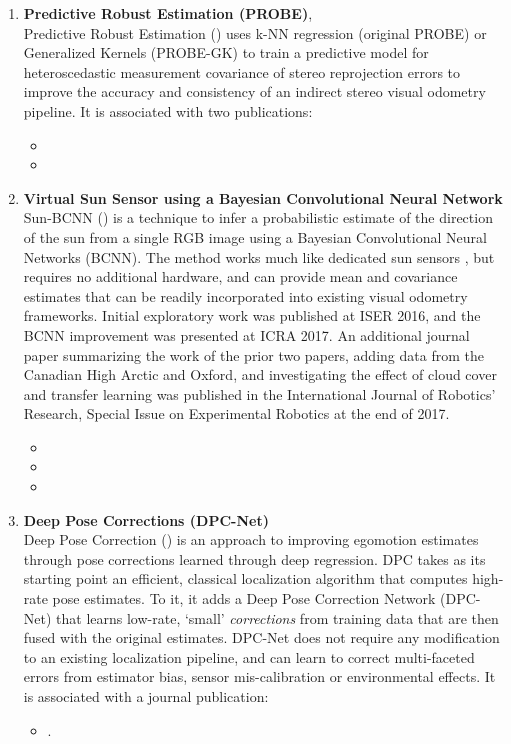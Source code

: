 \begin{enumerate}
\item \textbf{Predictive Robust Estimation (PROBE)},  \\
Predictive Robust Estimation () uses k-NN regression (original PROBE) or Generalized Kernels \citep{Vega-Brown2014-sb} (PROBE-GK) to train a predictive model for heteroscedastic measurement covariance of stereo reprojection errors to improve the accuracy and consistency of an indirect stereo visual odometry pipeline. It is associated with two publications:
\begin{itemize}
\item {}
\item {}
\end{itemize}

\item \textbf{Virtual Sun Sensor using a Bayesian Convolutional Neural Network} \\ 
Sun-BCNN () is a technique to infer a probabilistic estimate of the direction of the sun from a single RGB image using a Bayesian Convolutional Neural Networks (BCNN). The method works much like dedicated sun sensors \citep{Lambert2012-sn}, but requires no additional hardware, and can provide mean and covariance estimates that can be readily incorporated into existing visual odometry frameworks.  Initial exploratory work was published at ISER 2016, and the BCNN improvement was presented at ICRA 2017. An additional journal paper summarizing the work of the prior two papers, adding data from the Canadian High Arctic and Oxford, and investigating the effect of cloud cover and transfer learning was published in the International Journal of Robotics' Research, Special Issue on Experimental Robotics at the end of 2017. 
\begin{itemize}
\item {}
\item {}
\item {}
\end{itemize}

\item \textbf{Deep Pose Corrections (DPC-Net)} \\
Deep Pose Correction () is an approach to improving egomotion estimates through pose corrections learned through deep regression. DPC takes as its starting point an efficient, classical localization algorithm that computes high-rate pose estimates. To it, it adds a Deep Pose Correction Network (DPC-Net) that learns low-rate, `small' \textit{corrections} from training data that are then fused with the original estimates. DPC-Net does not require any modification to an existing localization pipeline, and can learn to correct multi-faceted errors from estimator bias, sensor mis-calibration or environmental effects. It is associated with a journal publication:
\begin{itemize}
\item {}.
\end{itemize}


\end{enumerate}
